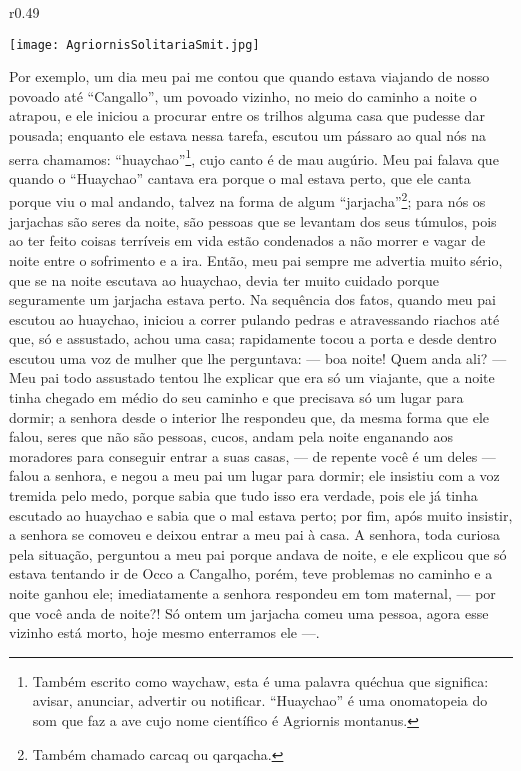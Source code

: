 \begin{wrapfigure}{r}{0.49\textwidth}
  \begin{center}
  \vspace{-20pt}
    \texttt{[image: AgriornisSolitariaSmit.jpg]}
  \end{center}
  \vspace{-20pt}
\end{wrapfigure}
Por exemplo, um dia meu pai me contou que quando estava viajando de nosso povoado até ``Cangallo'', um povoado vizinho, no meio do caminho a noite o atrapou, e ele iniciou a procurar entre os trilhos alguma casa que pudesse dar pousada; enquanto ele estava nessa tarefa, escutou um pássaro ao qual nós na serra chamamos: ``huaychao''\footnote{Também escrito como waychaw, esta é uma palavra quéchua que significa: avisar, anunciar, advertir ou notificar. ``Huaychao'' é uma onomatopeia do som que faz a ave cujo nome científico é Agriornis montanus.}, cujo canto é de mau augúrio.
Meu pai falava que quando o ``Huaychao'' cantava era porque o mal estava perto, que ele canta porque viu o mal andando, talvez na forma de algum ``jarjacha''\footnote{Também chamado carcaq ou qarqacha.}; para nós os jarjachas são seres da noite, são pessoas que se levantam dos seus túmulos, pois ao ter feito coisas terríveis em vida estão condenados a não morrer e vagar de noite entre o sofrimento e a ira. 
Então, meu pai sempre me advertia muito sério, que se na noite escutava ao huaychao, devia ter muito cuidado porque seguramente um jarjacha estava perto. 
Na sequência dos fatos, quando meu pai escutou ao huaychao, iniciou a correr pulando pedras e atravessando riachos até que, só e assustado, achou uma casa; rapidamente tocou a porta e desde dentro escutou uma voz de mulher que lhe perguntava: --- boa noite! Quem anda ali? ---
Meu pai todo assustado tentou lhe explicar que era só um viajante, que a noite tinha chegado em médio do seu caminho e que precisava só um lugar para dormir; a senhora desde o interior lhe respondeu que, da mesma forma que ele falou, seres que não são pessoas, cucos, andam pela noite enganando aos moradores para conseguir entrar a suas casas, --- de repente você é um deles --- falou a senhora, e negou a meu pai um lugar para dormir; ele insistiu com a voz tremida pelo medo, porque sabia que tudo isso era verdade, pois ele já tinha escutado ao huaychao e sabia que o mal estava perto; por fim, após muito insistir, a senhora se comoveu e deixou entrar a meu pai à casa. 
A senhora, toda curiosa pela situação, perguntou a meu pai porque andava de noite, e ele explicou que só estava tentando ir de Occo a Cangalho, porém, teve problemas no caminho e a noite ganhou ele; imediatamente a senhora respondeu em tom maternal, --- por que você anda de noite?! Só ontem um jarjacha comeu uma pessoa, agora esse vizinho está morto, hoje mesmo enterramos ele ---.

